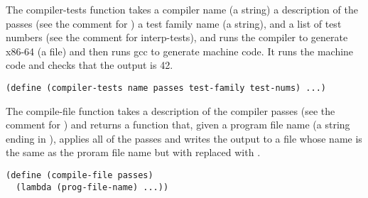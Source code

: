 \documentclass[12pt]{book}
\begin{document}
The compiler-tests function takes a compiler name (a string) a
description of the passes (see the comment for ) a
test family name (a string), and a list of test numbers (see the
comment for interp-tests), and runs the compiler to generate x86-64 (a
 file) and then runs gcc to generate machine code.  It runs
the machine code and checks that the output is 42.
\begin{lstlisting}
(define (compiler-tests name passes test-family test-nums) ...)
\end{lstlisting}

The compile-file function takes a description of the compiler passes
(see the comment for ) and returns a function that,
given a program file name (a string ending in ), applies all
of the passes and writes the output to a file whose name is the same
as the proram file name but with  replaced with .
\begin{lstlisting}
(define (compile-file passes)
  (lambda (prog-file-name) ...))
\end{lstlisting}



\end{document}
